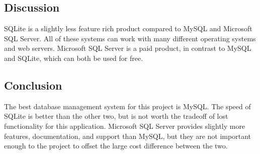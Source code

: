 \documentclass[onecolumn, draftclsnofoot,10pt, compsoc]{IEEEtran}
\begin{document}
\subsection{Discussion}
SQLite is a slightly less feature rich product compared to MySQL and Microsoft SQL Server. All of these systems can work with many different operating systems and web servers. Microsoft SQL Server is a paid product, in contrast to MySQL and SQLite, which can both be used for free.

\subsection{Conclusion}
The best database management system for this project is MySQL. The speed of SQLite is better than the other two, but is not worth the tradeoff of lost functionality for this application. Microsoft SQL Server provides slightly more features, documentation, and support than MySQL, but they are not important enough to the project to offset the large cost difference between the two.

\newpage


\end{document}

